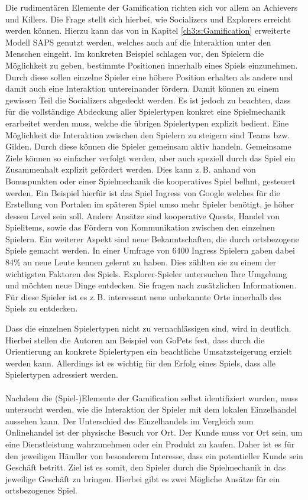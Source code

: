 Die rudimentären Elemente der Gamification richten sich vor allem an Achievers und Killers.
Die Frage stellt sich hierbei, wie Socializers und Explorers erreicht werden können.
Hierzu kann das von \textcite{Zichermann.2011} in Kapitel \ref{ch3:s:Gamification} erweiterte Modell SAPS genutzt werden, welches auch auf die Interaktion unter den Menschen eingeht. Im konkreten Beispiel schlagen \textcite{Zichermann.2011} vor, den Spielern die Möglichkeit zu geben, bestimmte Positionen innerhalb eines Spiels einzunehmen. Durch diese sollen einzelne Spieler eine höhere Position erhalten als andere und damit auch eine Interaktion untereinander fördern. Damit können zu einem gewissen Teil die Socializers abgedeckt werden.
Es ist jedoch zu beachten, dass für die vollständige Abdeckung aller Spielertypen konkret eine Spielmechanik erarbeitet werden muss, welche die übrigen Spielertypen explizit bedient. Eine Möglichkeit die Interaktion zwischen den Spielern zu steigern sind Teams bzw. Gilden. Durch diese können die Spieler gemeinsam aktiv handeln. Gemeinsame Ziele können so einfacher verfolgt werden, aber auch speziell durch das Spiel ein Zusammenhalt explizit gefördert werden. Dies kann z.\,B. anhand von Bonuspunkten oder einer Spielmechanik die kooperatives Spiel belhnt, gesteuert werden. Ein Beispiel hierfür ist das Spiel Ingress von Google welches für die Erstellung von Portalen im späteren Spiel umso mehr Spieler benötigt, je höher dessen Level sein soll.\cite{Celino.2013}
Andere Ansätze sind kooperative Quests, Handel von Spielitems, sowie das Fördern von Kommunikation zwischen den einzelnen Spielern.\cite{Caon.2013}
Ein weiterer Aspekt sind neue Bekanntschaften, die durch ortsbezogene Spiele gemacht werden. In einer Umfrage von 6400 Ingress Spielern gaben dabei 84\% an neue Leute kennen gelernt zu haben. Dies zählten sie zu einem der wichtigsten Faktoren des Spiels.\cite{Ingress.2014}
Explorer-Spieler untersuchen Ihre Umgebung und möchten neue Dinge entdecken. Sie fragen nach zusätzlichen Informationen. Für diese Spieler ist es z.\,B. interessant neue unbekannte Orte innerhalb des Spiels zu entdecken.

Dass die einzelnen Spielertypen nicht zu vernachlässigen sind, wird in \textcite{Bromley.2013} deutlich. Hierbei stellen die Autoren am Beispiel von GoPets fest, dass durch die Orientierung an konkrete Spielertypen ein beachtliche Umsatzsteigerung erzielt werden kann. Allerdings ist es wichtig für den Erfolg eines Spiels, dass alle Spielertypen adressiert werden.\cite{Bethke.2007}
\\\\
Nachdem die (Spiel-)Elemente der Gamification selbst identifiziert wurden, muss untersucht werden, wie die Interaktion der Spieler mit dem lokalen Einzelhandel aussehen kann.
Der Unterschied des Einzelhandels im Vergleich zum Onlinehandel ist der physische Besuch vor Ort. Der Kunde muss vor Ort sein, um eine Dienstleistung wahrzunehmen oder ein Produkt zu kaufen. Daher ist es für den jeweiligen Händler von besonderem Interesse, dass ein potentieller Kunde sein Geschäft betritt.
Ziel ist es somit, den Spieler durch die Spielmechanik in das jeweilige Geschäft zu bringen.
Hierbei gibt es zwei Mögliche Ansätze für ein ortsbezogenes Spiel.

